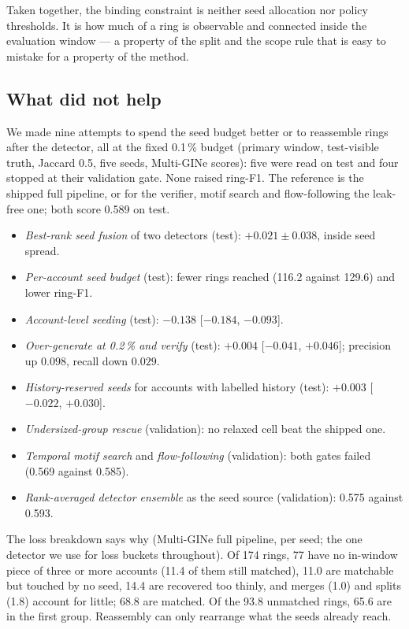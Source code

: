 Taken together, the binding constraint is neither seed allocation nor policy thresholds. It is
how much of a ring is observable and connected inside the evaluation window --- a property of
the split and the scope rule that is easy to mistake for a property of the method.

\subsection{What did not help}
\label{sec:results-negative}
We made nine attempts to spend the seed budget better or to reassemble rings after the
detector, all at the fixed 0.1\,\% budget (primary window, test-visible truth, Jaccard 0.5, five
seeds, Multi-GINe scores): five were read on test and four stopped at their validation gate. None
raised ring-F1. The reference is the shipped full pipeline, or for the verifier, motif search and
flow-following the leak-free one; both score 0.589 on test.
\begin{itemize}
\item \emph{Best-rank seed fusion} of two detectors (test): $+0.021 \pm 0.038$, inside seed spread.
\item \emph{Per-account seed budget} (test): fewer rings reached (116.2 against 129.6) and lower ring-F1.
\item \emph{Account-level seeding} (test): $-0.138$ [$-0.184$, $-0.093$].
\item \emph{Over-generate at 0.2\,\% and verify} (test): $+0.004$ [$-0.041$, $+0.046$]; precision up
$0.098$, recall down $0.029$.
\item \emph{History-reserved seeds} for accounts with labelled history (test): $+0.003$ [$-0.022$, $+0.030$].
\item \emph{Undersized-group rescue} (validation): no relaxed cell beat the shipped one.
\item \emph{Temporal motif search} and \emph{flow-following} (validation): both gates failed (0.569 against 0.585).
\item \emph{Rank-averaged detector ensemble} as the seed source (validation): 0.575 against 0.593.
\end{itemize}
The loss breakdown says why (Multi-GINe full pipeline, per seed; the one detector we use for loss
buckets throughout). Of 174 rings, 77 have no in-window piece of three or more accounts (11.4 of
them still matched), 11.0 are matchable but touched by no seed, 14.4 are recovered too thinly, and
merges (1.0) and splits (1.8) account for little; 68.8 are matched. Of the 93.8 unmatched rings,
65.6 are in the first group. Reassembly can only rearrange what the seeds already reach.
